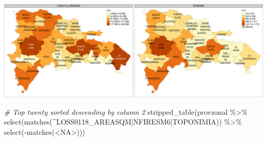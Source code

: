 \documentclass[10pt,landscape,a3paper]{article}
\newenvironment{Shaded}{\begin{snugshade}}{\end{snugshade}}
\newcommand{\CommentTok}[1]{\textcolor[rgb]{0.56,0.35,0.01}{\textit{#1}}}
\newcommand{\FunctionTok}[1]{\textcolor[rgb]{0.00,0.00,0.00}{#1}}
\newcommand{\NormalTok}[1]{#1}
\newcommand{\SpecialCharTok}[1]{\textcolor[rgb]{0.00,0.00,0.00}{#1}}
\newcommand{\StringTok}[1]{\textcolor[rgb]{0.31,0.60,0.02}{#1}}
\begin{document}
\begin{center}\includegraphics{img/data-download-preparation-eda/zonal-prov-7} \end{center}

\begin{Shaded}
\begin{Highlighting}[]
\CommentTok{\# Top twenty sorted descending by column 2}
\FunctionTok{stripped\_table}\NormalTok{(provzonal }\SpecialCharTok{\%\textgreater{}\%} \FunctionTok{select}\NormalTok{(}\FunctionTok{matches}\NormalTok{(}\StringTok{\textquotesingle{}\^{}LOSS0118\_AREASQM|NFIRESM6|TOPONIMIA\textquotesingle{}}\NormalTok{)) }\SpecialCharTok{\%\textgreater{}\%} \FunctionTok{select}\NormalTok{(}\SpecialCharTok{{-}}\FunctionTok{matches}\NormalTok{(}\StringTok{\textquotesingle{}\textless{}NA\textgreater{}\textquotesingle{}}\NormalTok{)))}
\end{Highlighting}
\end{Shaded}
\end{document}
